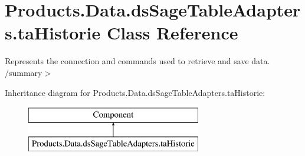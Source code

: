 \hypertarget{class_products_1_1_data_1_1ds_sage_table_adapters_1_1ta_historie}{}\section{Products.\+Data.\+ds\+Sage\+Table\+Adapters.\+ta\+Historie Class Reference}
\label{class_products_1_1_data_1_1ds_sage_table_adapters_1_1ta_historie}


Represents the connection and commands used to retrieve and save data. /summary$>$  


Inheritance diagram for Products.\+Data.\+ds\+Sage\+Table\+Adapters.\+ta\+Historie\+:\begin{figure}[H]
\begin{center}
\leavevmode
\includegraphics[height=2.000000cm]{class_products_1_1_data_1_1ds_sage_table_adapters_1_1ta_historie}
\end{center}
\end{figure}
